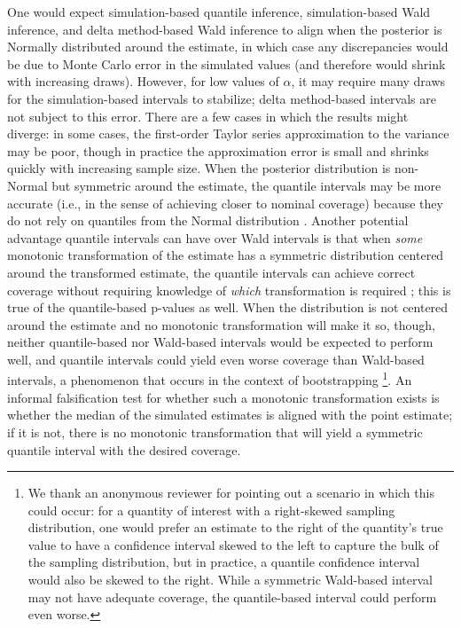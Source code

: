 One would expect simulation-based quantile inference, simulation-based Wald inference, and delta method-based Wald inference to align when the posterior is Normally distributed around the estimate, in which case any discrepancies would be due to Monte Carlo error in the simulated values (and therefore would shrink with increasing draws). However, for low values of \(\alpha\), it may require many draws for the simulation-based intervals to stabilize; delta method-based intervals are not subject to this error. There are a few cases in which the results might diverge: in some cases, the first-order Taylor series approximation to the variance may be poor, though in practice the approximation error is small and shrinks quickly with increasing sample size. When the posterior distribution is non-Normal but symmetric around the estimate, the quantile intervals may be more accurate (i.e., in the sense of achieving closer to nominal coverage) because they do not rely on quantiles from the Normal distribution \citep{tofighiMonteCarloConfidence2016}.
Another potential advantage quantile intervals can have over Wald intervals is that when \emph{some} monotonic transformation of the estimate has a symmetric distribution centered around the transformed estimate, the quantile intervals can achieve correct coverage without requiring knowledge of \emph{which} transformation is required \citep{efronBootstrapMethodsStandard1986}; this is true of the quantile-based p-values as well. When the distribution is not centered around the estimate and no monotonic transformation will make it so, though, neither quantile-based nor Wald-based intervals would be expected to perform well, and quantile intervals could yield even worse coverage than Wald-based intervals, a phenomenon that occurs in the context of bootstrapping \citep{efronBootstrapMethodsStandard1986}\footnote{We thank an anonymous reviewer for pointing out a scenario in which this could occur: for a quantity of interest with a right-skewed sampling distribution, one would prefer an estimate to the right of the quantity's true value to have a confidence interval skewed to the left to capture the bulk of the sampling distribution, but in practice, a quantile confidence interval would also be skewed to the right. While a symmetric Wald-based interval may not have adequate coverage, the quantile-based interval could perform even worse.}. An informal falsification test for whether such a monotonic transformation exists is whether the median of the simulated estimates is aligned with the point estimate; if it is not, there is no monotonic transformation that will yield a symmetric quantile interval with the desired coverage.

